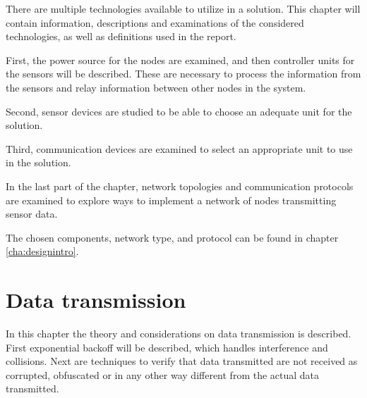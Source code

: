 \label{cha:technologies}
There are multiple technologies available to utilize in a solution. This chapter will contain information, descriptions and examinations of the considered technologies, as well as definitions used in the report.

First, the power source for the nodes are examined, and then controller units for the sensors will be described. These are necessary to process the information from the sensors and relay information between other nodes in the system.

Second, sensor devices are studied to be able to choose an adequate unit for the solution.

Third, communication devices are examined to select an appropriate unit to use in the solution. 

In the last part of the chapter, network topologies and communication protocols are examined to explore ways to implement a network of nodes transmitting sensor data.

The chosen components, network type, and protocol can be found in chapter \ref{cha:designintro}.













\chapter{Data transmission}
In this chapter the theory and considerations on data transmission is described. First exponential backoff will be described, which handles interference and collisions. Next are techniques to verify that data transmitted are not received as corrupted, obfuscated or in any other way different from the actual data transmitted.




